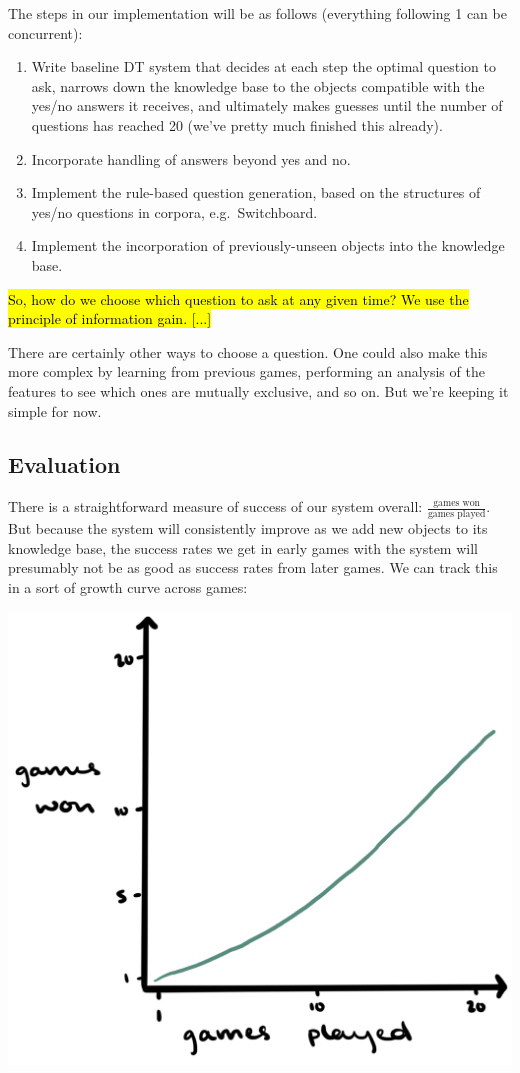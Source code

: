 \documentclass[a4paper,12pt]{article}
\begin{document}
The steps in our implementation will be as follows (everything following 1 can be concurrent):
\begin{enumerate}
	\item Write baseline DT system that decides at each step the optimal question to ask, narrows down the knowledge base to the objects compatible with the yes/no answers it receives, and ultimately makes guesses until the number of questions has reached 20 (we've pretty much finished this already).
	\item Incorporate handling of answers beyond yes and no.
	\item Implement the rule-based question generation, based on the structures of yes/no questions in corpora, e.g.\ Switchboard.
	\item Implement the incorporation of previously-unseen objects into the knowledge base.
\end{enumerate}


\hl{So, how do we choose which question to ask at any given time?
We use the principle of information gain.
[...]}

There are certainly other ways to choose a question.
One could also make this more complex by learning from previous games, performing an analysis of the features to see which ones are mutually exclusive, and so on.
But we're keeping it simple for now.


\subsection*{Evaluation}

There is a straightforward measure of success of our system overall: $\frac{\text{games won}}{\text{games played}}$. But because the system will consistently improve as we add new objects to its knowledge base, the success rates we get in early games with the system will presumably not be as good as success rates from later games. We can track this in a sort of growth curve across games:
	
\begin{center}
	\includegraphics[width=.5\linewidth]{growth-curve.png}
\end{center}
\end{document}
